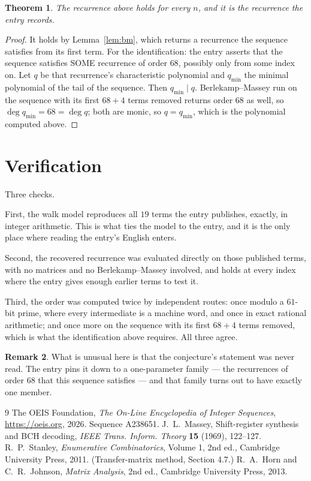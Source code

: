\documentclass[11pt,a4paper]{article}
\theoremstyle{plain}
\newtheorem{theorem}{Theorem}
\theoremstyle{definition}
\newtheorem{remark}[theorem]{Remark}
\begin{document}
\begin{theorem}
The recurrence above holds for every $n$, and it is the recurrence the entry records.
\end{theorem}

\begin{proof}
It holds by Lemma~\ref{lem:bm}, which returns a recurrence the sequence satisfies from its
first term. For the identification: the entry asserts that the sequence satisfies SOME
recurrence of order $68$, possibly only from some index on. Let $q$ be that recurrence's
characteristic polynomial and $q_{\min}$ the minimal polynomial of the tail of the sequence.
Then $q_{\min}\mid q$. Berlekamp--Massey run on the sequence with its first $68+4$ terms
removed returns order $68$ as well, so $\deg q_{\min}=68=\deg q$; both are monic, so
$q=q_{\min}$, which is the polynomial computed above.
\end{proof}

\section{Verification}

Three checks.

First, the walk model reproduces all $19$ terms the entry publishes, exactly, in integer
arithmetic. This is what ties the model to the entry, and it is the only place where reading
the entry's English enters.

Second, the recovered recurrence was evaluated directly on those published terms, with no
matrices and no Berlekamp--Massey involved, and holds at every index where the entry gives
enough earlier terms to test it.

Third, the order was computed twice by independent routes: once modulo a $61$-bit prime, where
every intermediate is a machine word, and once in exact rational arithmetic; and once more on
the sequence with its first $68+4$ terms removed, which is what the identification above
requires. All three agree.

\begin{remark}
What is unusual here is that the conjecture's statement was never read. The entry pins it down
to a one-parameter family --- the recurrences of order $68$ that this sequence satisfies
--- and that family turns out to have exactly one member.
\end{remark}

\begin{thebibliography}{9}
 The OEIS Foundation, \emph{The On-Line Encyclopedia of Integer
Sequences}, \url{https://oeis.org}, 2026. Sequence A238651.
 J.~L.~Massey, Shift-register synthesis and BCH decoding, \emph{IEEE
Trans. Inform. Theory} \textbf{15} (1969), 122--127.
 R.~P.~Stanley, \emph{Enumerative Combinatorics}, Volume 1, 2nd ed.,
Cambridge University Press, 2011. (Transfer-matrix method, Section 4.7.)
 R.~A.~Horn and C.~R.~Johnson, \emph{Matrix Analysis}, 2nd ed., Cambridge
University Press, 2013.
\end{thebibliography}
\end{document}
